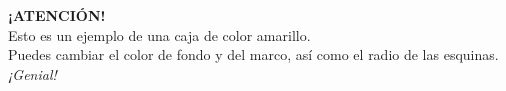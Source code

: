 \begin{tcolorbox}[colback=yellow,colframe=yellow!75!black,arc=0pt,outer arc=0pt]
  \textbf{¡ATENCIÓN!} \\

  Esto es un ejemplo de una caja de color amarillo. \\
  Puedes cambiar el color de fondo y del marco, así como el radio de las esquinas. \\

  \textit{¡Genial!}
\end{tcolorbox}
